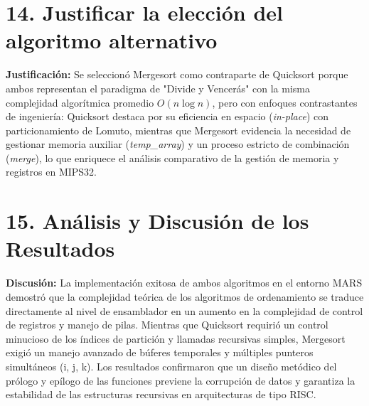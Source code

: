\documentclass[12pt,a4paper]{article}
\begin{document}
\section*{14. Justificar la elección del algoritmo alternativo}

\textbf{Justificación:} Se seleccionó Mergesort como contraparte de Quicksort porque ambos representan el paradigma de "Divide y Vencerás" con la misma complejidad algorítmica promedio $O(n \log n)$, pero con enfoques contrastantes de ingeniería: Quicksort destaca por su eficiencia en espacio (\textit{in-place}) con particionamiento de Lomuto, mientras que Mergesort evidencia la necesidad de gestionar memoria auxiliar (\textit{temp\_array}) y un proceso estricto de combinación (\textit{merge}), lo que enriquece el análisis comparativo de la gestión de memoria y registros en MIPS32.

\section*{15. Análisis y Discusión de los Resultados}

\textbf{Discusión:} La implementación exitosa de ambos algoritmos en el entorno MARS demostró que la complejidad teórica de los algoritmos de ordenamiento se traduce directamente al nivel de ensamblador en un aumento en la complejidad de control de registros y manejo de pilas. Mientras que Quicksort requirió un control minucioso de los índices de partición y llamadas recursivas simples, Mergesort exigió un manejo avanzado de búferes temporales y múltiples punteros simultáneos (i, j, k). Los resultados confirmaron que un diseño metódico del prólogo y epílogo de las funciones previene la corrupción de datos y garantiza la estabilidad de las estructuras recursivas en arquitecturas de tipo RISC.
\end{document}

